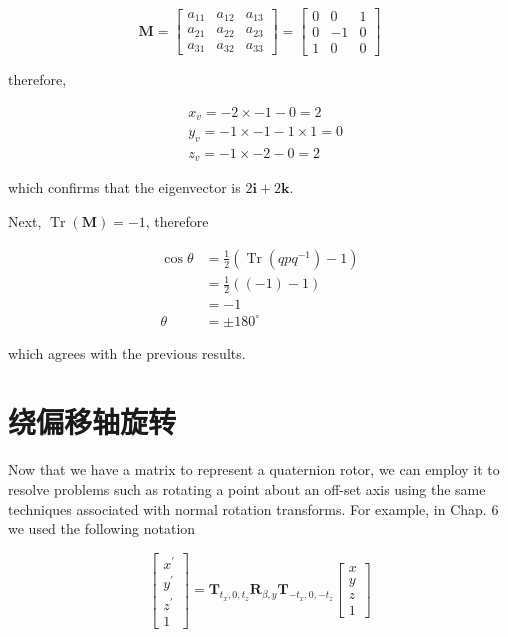 $$
\mathbf{M}=\left[\begin{array}{lll}
a_{11} & a_{12} & a_{13} \\
a_{21} & a_{22} & a_{23} \\
a_{31} & a_{32} & a_{33}
\end{array}\right]=\left[\begin{array}{ccc}
0 & 0 & 1 \\
0 & -1 & 0 \\
1 & 0 & 0
\end{array}\right]
$$

therefore,

$$
\begin{aligned}
& x_{v}=-2 \times-1-0=2 \\
& y_{v}=-1 \times-1-1 \times 1=0 \\
& z_{v}=-1 \times-2-0=2
\end{aligned}
$$

which confirms that the eigenvector is $2 \mathbf{i}+2 \mathbf{k}$.

Next, $\operatorname{Tr}(\mathbf{M})=-1$, therefore

$$
\begin{aligned}
\cos \theta & =\frac{1}{2}\left(\operatorname{Tr}\left(q p q^{-1}\right)-1\right) \\
& =\frac{1}{2}((-1)-1) \\
& =-1 \\
\theta & =\pm 180^{\circ}
\end{aligned}
$$

which agrees with the previous results.

\section{绕偏移轴旋转}
Now that we have a matrix to represent a quaternion rotor, we can employ it to resolve problems such as rotating a point about an off-set axis using the same techniques associated with normal rotation transforms. For example, in Chap. 6 we used the following notation

$$
\left[\begin{array}{c}
x^{\prime} \\
y^{\prime} \\
z^{\prime} \\
1
\end{array}\right]=\mathbf{T}_{t_{x}, 0, t_{z}} \mathbf{R}_{\beta, y} \mathbf{T}_{-t_{x}, 0,-t_{z}}\left[\begin{array}{c}
x \\
y \\
z \\
1
\end{array}\right]
$$

